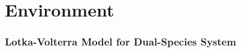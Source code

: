 \section{Environment}\label{sec:model2}


\subsubsection{Lotka-Volterra Model for Dual-Species System}